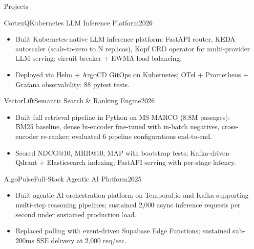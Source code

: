 \documentclass[]{mcdowellcv}
\begin{document}
\begin{cvsection}{Projects}
  \begin{cvsubsection}{CortexQ}{Kubernetes LLM Inference Platform}{2026}
    \begin{itemize}
      \item Built Kubernetes-native LLM inference platform: FastAPI router, KEDA autoscaler (scale-to-zero to N replicas), Kopf CRD operator for multi-provider LLM serving; circuit breaker + EWMA load balancing.
      \item Deployed via Helm + ArgoCD GitOps on Kubernetes; OTel + Prometheus + Grafana observability; 88 pytest tests.
    \end{itemize}
    \vspace{-1.5pt}
  \end{cvsubsection}

  \begin{cvsubsection}{VectorLift}{Semantic Search \& Ranking Engine}{2026}
    \begin{itemize}
      \item Built full retrieval pipeline in Python on MS MARCO (8.8M passages): BM25 baseline, dense bi-encoder fine-tuned with in-batch negatives, cross-encoder re-ranker; evaluated 6 pipeline configurations end-to-end.
      \item Scored NDCG@10, MRR@10, MAP with bootstrap tests; Kafka-driven Qdrant + Elasticsearch indexing; FastAPI serving with per-stage latency.
    \end{itemize}
    \vspace{-1.5pt}
  \end{cvsubsection}

  \begin{cvsubsection}{AlgoPulse}{Full-Stack Agentic AI Platform}{2025}
    \begin{itemize}
      \item Built agentic AI orchestration platform on Temporal.io and Kafka supporting multi-step reasoning pipelines; sustained 2,000 async inference requests per second under sustained production load.
      \item Replaced polling with event-driven Supabase Edge Functions; sustained sub-200ms SSE delivery at 2,000 req/sec.
    \end{itemize}
  \end{cvsubsection}
\end{cvsection}
\end{document}
